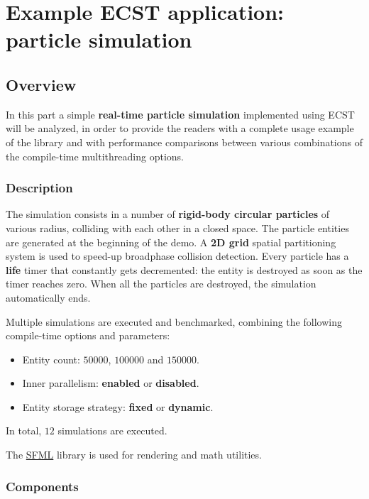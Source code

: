 \documentclass[twoside, 12pt, a4paper, openany]{book}
\begin{document}
\part{Example ECST application: particle simulation}

\hypertarget{part3_sim}{\chapter{Overview}\label{part3_sim}}

In this part a simple \textbf{real-time particle simulation} implemented
using ECST will be analyzed, in order to provide the readers with a
complete usage example of the library and with performance comparisons
between various combinations of the compile-time multithreading options.

\section{Description}\label{description}

The simulation consists in a number of \textbf{rigid-body circular
particles} of various radius, colliding with each other in a closed
space. The particle entities are generated at the beginning of the demo.
A \textbf{2D grid} spatial partitioning system is used to speed-up
broadphase collision detection. Every particle has a \textbf{life} timer
that constantly gets decremented: the entity is destroyed as soon as the
timer reaches zero. When all the particles are destroyed, the simulation
automatically ends.

Multiple simulations are executed and benchmarked, combining the
following compile-time options and parameters:

\begin{itemize}
\item
  Entity count: \(50000\), \(100000\) and \(150000\).
\item
  Inner parallelism: \textbf{enabled} or \textbf{disabled}.
\item
  Entity storage strategy: \textbf{fixed} or \textbf{dynamic}.
\end{itemize}

In total, \(12\) simulations are executed.

The \href{http://sfml-dev.org}{SFML} library is used for rendering and
math utilities.

\section{Components}\label{components}
\end{document}
